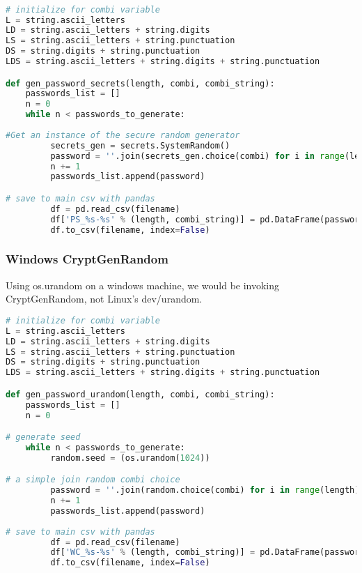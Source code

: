 \documentclass[letterpaper,twocolumn,10pt]{article}
\begin{document}
\begin{lstlisting}[language=python, frame=none]

# initialize for combi variable
L = string.ascii_letters
LD = string.ascii_letters + string.digits
LS = string.ascii_letters + string.punctuation
DS = string.digits + string.punctuation
LDS = string.ascii_letters + string.digits + string.punctuation

def gen_password_secrets(length, combi, combi_string):
    passwords_list = []
    n = 0
    while n < passwords_to_generate:
        
#Get an instance of the secure random generator
         secrets_gen = secrets.SystemRandom()
         password = ''.join(secrets_gen.choice(combi) for i in range(length))
         n += 1
         passwords_list.append(password)

# save to main csv with pandas
         df = pd.read_csv(filename)
         df['PS_%s-%s' % (length, combi_string)] = pd.DataFrame(passwords_list)
         df.to_csv(filename, index=False)
\end{lstlisting}

\subsubsection{Windows CryptGenRandom}
Using os.urandom on a windows machine, we would be invoking CryptGenRandom, not Linux's dev/urandom. 

\begin{lstlisting}[language=python, frame=none]
# initialize for combi variable
L = string.ascii_letters
LD = string.ascii_letters + string.digits
LS = string.ascii_letters + string.punctuation
DS = string.digits + string.punctuation
LDS = string.ascii_letters + string.digits + string.punctuation

def gen_password_urandom(length, combi, combi_string):
    passwords_list = []
    n = 0

# generate seed
    while n < passwords_to_generate:
         random.seed = (os.urandom(1024))

# a simple join random combi choice
         password = ''.join(random.choice(combi) for i in range(length))
         n += 1
         passwords_list.append(password)
         
# save to main csv with pandas
         df = pd.read_csv(filename)
         df['WC_%s-%s' % (length, combi_string)] = pd.DataFrame(passwords_list)
         df.to_csv(filename, index=False)
\end{lstlisting}
\end{document}
